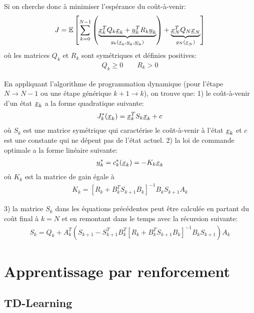 Si on cherche donc à minimiser l'espérance du coût-à-venir:
\begin{align}
    J = {\mathbb E}\left[  \sum_{k=0}^{N-1} 
    \left(
    \underbrace{
    \underline{x}_k^T Q_k \underline{x}_k + \underline{u}_k^T R_k \underline{u}_k
    }_{ g_k( \underline{x}_k, \underline{u}_k , \underline{w}_k ) }
    \right)
    +
    \underbrace{
    \underline{x}_N^T Q_N \underline{x}_N
    }_{ g_N( \underline{x}_N )  }
     \right]
\end{align}
où les matrices $Q_k$ et $R_k$ sont symétriques et définies positives:
\begin{align}
    Q_k \geq 0 \quad \quad R_k > 0 
\end{align}

En appliquant l'algorithme de programmation dynamique (pour l'étape $N\rightarrow N-1$ ou une étape générique $k+1 \rightarrow k$), on trouve que:
1) le coût-à-venir d'un état $\underline{x}_k$ a la forme quadratique suivante:
\begin{align}
    J_k^*( \underline{x}_k ) = \underline{x}_k^T S_k \underline{x}_k + c
\end{align}
où $S_k$ est une matrice symétrique qui caractérise le coût-à-venir à l'état $\underline{x}_k$ et $c$ est une constante qui ne dépent pas de l'état actuel.
2) la loi de commande optimale a la forme linéaire suivante:
\begin{align}
    \underline{u}_k^* = c_k^*( \underline{x}_k ) = - K_k \underline{x}_k
\end{align}
où $K_k$ est la matrice de gain égale à
\begin{align}
    K_k = \left[ R_k + B_k^T S_{k+1} B_k \right]^{-1} B_k S_{k+1} A_k
\end{align}

3) la matrice $S_k$ dans les équations précédentes peut être calculée en partant du coût final à $k=N$ et en remontant dans le temps avec la récursion suivante:
\begin{align}
    S_k = Q_k + A_k^T \left( S_{k+1} - S_{k+1}^T B_k^T  \left[ R_k + B_k^T S_{k+1} B_k \right]^{-1} B_k S_{k+1} \right) A_k
\end{align}

\section{Apprentissage par renforcement}


\subsection{TD-Learning}

